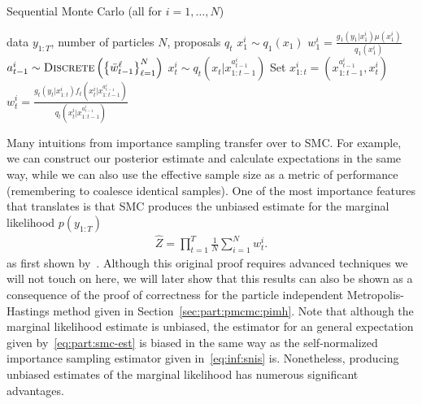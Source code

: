 \begin{algorithm}[tb]
	\caption{Sequential Monte Carlo \hfill {\small (all for $i=1,\ldots,N$)}}
	\label{alg:part:smc}
	\begin{spacing}{1.2}
		\begin{algorithmic}[1]
			\renewcommand{\algorithmicrequire}{\textbf{Inputs:}}
			\renewcommand{\algorithmicensure}{\textbf{Outputs:}}				 
			\Require  data $y_{1:T}$, number of particles $N$, proposals $q_t$
			\State $x_1^i \sim q_1(x_1)$
			\State $w_1^i = \frac{g_1(y_1|x_1^i) \mu(x_1^i)}{q_1(x_1^i)}$
			\State $a_{t-1}^i \sim \operatorname*{\textsc{Discrete}}\left(\left\{\bar w_{t-1}^{\ell}\right\}_{\ell=1}^N\right)$%
			\State $x_t^i \sim q_t(x_t | x_{1:t-1}^{a_{t-1}^i})$ 
			\State Set $x_{1:t}^i = (x_{1:t-1}^{a_{t-1}^i},x_t^i)$
			\State $w_t^i = \frac{g_t(y_t|x_{1:t}^i) f_t(x_t^i | x_{1:t-1}^{a_{t-1}^i})}{q_t(x_t^i|x_{1:t-1}^{a_{t-1}^i})}$
			\EndFor
		\end{algorithmic}
	\end{spacing}
\end{algorithm}

Many intuitions from importance sampling transfer over to SMC.  For example, we can construct our posterior
estimate and calculate expectations in the same way, while we can also use the effective sample size as
a metric of performance (remembering to coalesce identical samples). 
One of the most importance features that translates is that SMC produces the
unbiased estimate for the marginal likelihood $p(y_{1:T})$
\begin{align}
\label{eq:part:ML}
\hat Z = \prod_{t=1}^T \frac{1}{N} \sum_{i=1}^N w_{t}^{i}.
\end{align}
as first shown by~\cite{del2004feynman}.  Although this original
proof requires advanced techniques we will not touch on here, we will later show that this results can also be shown
as a consequence of the proof of correctness for the particle independent Metropolis-Hastings method
given in Section~\ref{sec:part:pmcmc:pimh}.  Note that although the marginal likelihood estimate is
unbiased, the estimator for an general expectation given by~\eqref{eq:part:smc-est} is biased in the same
way as the self-normalized importance sampling estimator given in~\eqref{eq:inf:snis} is.  Nonetheless, producing unbiased
estimates of the marginal likelihood has numerous significant advantages.  

